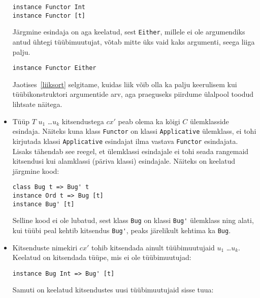 \documentclass[12pt]{article}
\begin{document}
\begin{itemize}
            \begin{verbatim}instance Functor Int
instance Functor [t]\end{verbatim}

            Järgmine esindaja on aga keelatud, sest \verb!Either!, millele ei ole argumendiks antud ühtegi tüübimuutujat, võtab mitte üks vaid kaks argumenti, seega liiga palju.

            \begin{verbatim}instance Functor Either\end{verbatim}

            Jaotises~\ref{liiksort} selgitame, kuidas liik võib olla ka palju keerulisem kui tüübikonstruktori argumentide arv, aga praeguseks piirdume ülalpool toodud lihtsate näitega.
          \item
            Tüüp $T$ $u_1$ \ldots $u_k$ kitsendustega $cx'$ peab olema ka kõigi $C$ ülemklasside esindaja. Näiteks kuna klass \verb!Functor! on klassi \verb!Applicative! ülemklass, ei tohi kirjutada klassi \verb!Applicative! esindajat ilma vastava \verb!Functor! esindajata. Lisaks tähendab see reegel, et ülemklassi esindajale ei tohi seada rangemaid kitsendusi kui alamklassi (päriva klassi) esindajale. Näiteks on keelatud järgmine kood:

            \begin{verbatim}class Bug t => Bug' t
instance Ord t => Bug [t]
instance Bug' [t]\end{verbatim}

            Selline kood ei ole lubatud, sest klass \verb!Bug! on klassi \verb!Bug'! ülemklass ning alati, kui tüübi peal kehtib kitsendus \verb!Bug'!, peaks järelikult kehtima ka \verb!Bug!.
          \item
            Kitsenduste nimekiri $cx'$ tohib kitsendada ainult tüübimuutujaid $u_1$ \ldots $u_k$. Keelatud on kitsendada tüüpe, mis ei ole tüübimuutujad:

            \begin{verbatim}instance Bug Int => Bug' [t]\end{verbatim}

            Samuti on keelatud kitsendustes uusi tüübimuutujaid sisse tuua:


\end{itemize}
\end{document}
